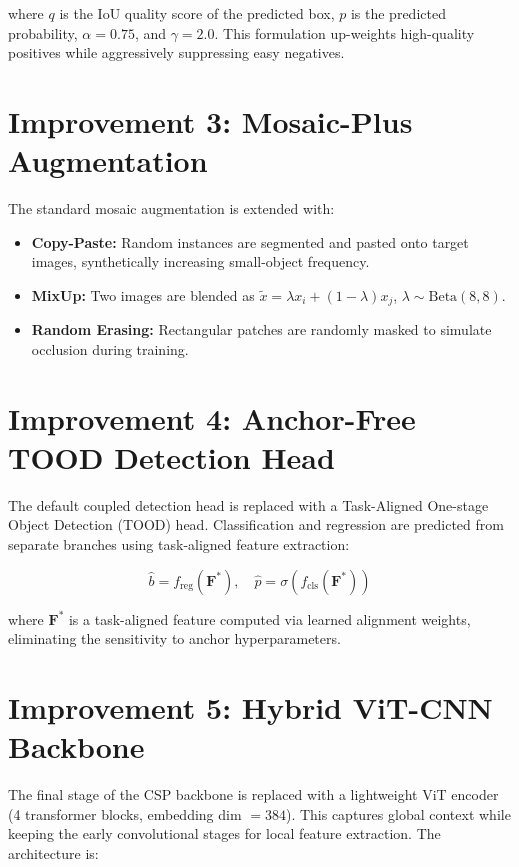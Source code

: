 \documentclass[12pt, a4paper]{report}
\begin{document}
where $q$ is the IoU quality score of the predicted box, $p$ is the 
predicted probability, $\alpha = 0.75$, and $\gamma = 2.0$. This formulation 
up-weights high-quality positives while aggressively suppressing easy negatives.

\section{Improvement 3: Mosaic-Plus Augmentation}

The standard mosaic augmentation is extended with:
\begin{itemize}
  \item \textbf{Copy-Paste:} Random instances are segmented and pasted 
    onto target images, synthetically increasing small-object frequency.
  \item \textbf{MixUp:} Two images are blended as 
    $\tilde{x} = \lambda x_i + (1-\lambda) x_j$, $\lambda \sim \text{Beta}(8,8)$.
  \item \textbf{Random Erasing:} Rectangular patches are randomly masked 
    to simulate occlusion during training.
\end{itemize}

\section{Improvement 4: Anchor-Free TOOD Detection Head}

The default coupled detection head is replaced with a Task-Aligned One-stage 
Object Detection (TOOD) head. Classification and regression are predicted 
from separate branches using task-aligned feature extraction:

\begin{equation}
  \hat{b} = f_{\text{reg}}(\mathbf{F}^*), \quad 
  \hat{p} = \sigma(f_{\text{cls}}(\mathbf{F}^*))
  \label{eq:tood}
\end{equation}

where $\mathbf{F}^*$ is a task-aligned feature computed via learned alignment 
weights, eliminating the sensitivity to anchor hyperparameters.

\section{Improvement 5: Hybrid ViT-CNN Backbone}

The final stage of the CSP backbone is replaced with a lightweight 
ViT encoder (4 transformer blocks, embedding dim $= 384$). This captures 
global context while keeping the early convolutional stages for local 
feature extraction. The architecture is:
\end{document}
